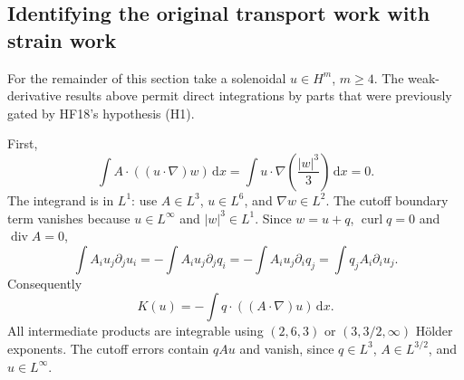 \documentclass[11pt,a4paper]{article}
\theoremstyle{definition}
\newcommand{\dd}{\,\mathrm dx}
\DeclareMathOperator{\diver}{div}
\DeclareMathOperator{\curl}{curl}
\begin{document}
\subsection{Identifying the original transport work with strain work}
For the remainder of this section take a solenoidal $u\in H^m$, $m\ge4$. The weak-derivative results above permit direct integrations by parts that were previously gated by HF18's hypothesis (H1).

First,
\begin{equation}\label{eq:advectw}
 \int A\cdot((u\cdot\nabla)w)\dd
 =\int u\cdot\nabla\left(\frac{|w|^3}{3}\right)\dd=0.
\end{equation}
The integrand is in $L^1$: use $A\in L^3$, $u\in L^6$, and $\nabla w\in L^2$. The cutoff boundary term vanishes because $u\in L^\infty$ and $|w|^3\in L^1$. Since $w=u+q$, $\curl q=0$ and $\diver A=0$,
\[
 \int A_i u_j\partial_j u_i
 =-\int A_i u_j\partial_j q_i
 =-\int A_i u_j\partial_i q_j
 =\int q_j A_i\partial_i u_j.
\]
Consequently
\begin{equation}\label{eq:strainK}
 K(u)=-\int q\cdot((A\cdot\nabla)u)\dd.
\end{equation}
All intermediate products are integrable using $(2,6,3)$ or $(3,3/2,\infty)$ H\"older exponents. The cutoff errors contain $qAu$ and vanish, since $q\in L^3$, $A\in L^{3/2}$, and $u\in L^\infty$.
\end{document}
